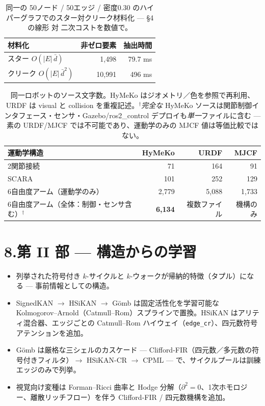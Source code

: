\documentclass[10pt]{article}
\begin{document}
\begin{table}[h]\centering\small
\caption{同一の 50ノード / 50エッジ / 密度0.30 のハイパーグラフでのスター対クリーク材料化 --- \S4 の線形 対 二次コストを数値で。}
\begin{tabular}{lrr}\toprule
材料化 & 非ゼロ要素 & 抽出時間\\\midrule
スター \;$O(|E|\,\bar d)$ & 1{,}498 & 79.7 ms\\
クリーク \;$O(|E|\,\bar d^{2})$ & 10{,}991 & 496 ms\\\bottomrule
\end{tabular}\end{table}

\begin{table}[h]\centering\small
\caption{同一ロボットのソース文字数。HyMeKo はジオメトリ／色を参照で再利用、URDF は visual と collision を重複記述。$^\dagger$\emph{完全な} HyMeKo ソースは関節制御インタフェース・センサ・Gazebo/ros2\_control デプロイも\emph{単一}ファイルに含む --- 素の URDF/MJCF では不可能であり、運動学のみの MJCF 値は等価比較ではない。}
\begin{tabular}{lrrr}\toprule
運動学構造 & HyMeKo & URDF & MJCF\\\midrule
2関節接続 & 71 & 164 & 91\\
SCARA & 101 & 252 & 129\\
6自由度アーム（運動学のみ） & 2{,}779 & 5{,}088 & 1{,}733\\
\addlinespace
6自由度アーム（全体：制御・センサ含む）$^\dagger$ & \textbf{6{,}134} & 複数ファイル & 機構のみ\\\bottomrule
\end{tabular}\end{table}

\section*{\color{accent}8.\quad 第 II 部 --- 構造からの学習}
\begin{itemize}
\item 列挙された符号付き $k$-サイクルと $k$-ウォークが帰納的特徴（タプル）になる — 事前情報としての構造。
\item SignedKAN $\to$ HSiKAN $\to$ Gömb は固定活性化を学習可能な Kolmogorov--Arnold（Catmull--Rom）スプラインで置換。HSiKAN はアリティ混合器、エッジごとの Catmull--Rom ハイウェイ（\texttt{edge\_cr}）、四元数符号アテンションを追加。
\item Gömb は厳格な三シェルのカスケード — Clifford-FIR（四元数／多元数の符号付きフィルタ）$\to$ HSiKAN-CR $\to$ CPML — で、サイクルプールは訓練エッジのみで列挙。
\item 視覚向け変種は Forman--Ricci 曲率と Hodge 分解（$\partial^2{=}0$、1次ホモロジー、離散リッチフロー）を伴う Clifford-FIR / 四元数機構を追加。
\end{itemize}
\end{document}
